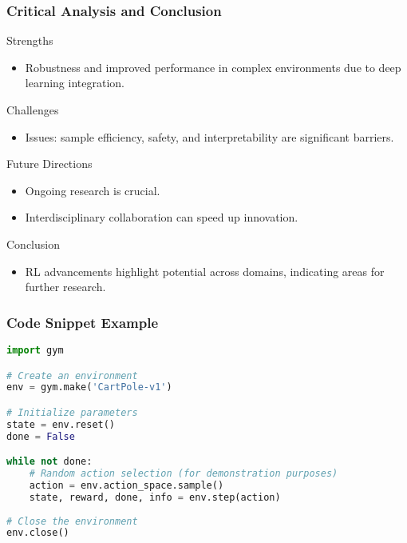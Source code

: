 \documentclass[aspectratio=169]{beamer}
\begin{document}
\begin{frame}
    \frametitle{Critical Analysis and Conclusion}
    \begin{block}{Strengths}
        \begin{itemize}
            \item Robustness and improved performance in complex environments due to deep learning integration.
        \end{itemize}
    \end{block}
    \begin{block}{Challenges}
        \begin{itemize}
            \item Issues: sample efficiency, safety, and interpretability are significant barriers.
        \end{itemize}
    \end{block}
    \begin{block}{Future Directions}
        \begin{itemize}
            \item Ongoing research is crucial.
            \item Interdisciplinary collaboration can speed up innovation.
        \end{itemize}
    \end{block}
    \begin{block}{Conclusion}
        \begin{itemize}
            \item RL advancements highlight potential across domains, indicating areas for further research.
        \end{itemize}
    \end{block}
\end{frame}

\begin{frame}[fragile]
    \frametitle{Code Snippet Example}
    \begin{lstlisting}[language=Python]
import gym

# Create an environment
env = gym.make('CartPole-v1')

# Initialize parameters
state = env.reset()
done = False

while not done:
    # Random action selection (for demonstration purposes)
    action = env.action_space.sample()
    state, reward, done, info = env.step(action)
    
# Close the environment
env.close()
    \end{lstlisting}
\end{frame}
\end{document}
